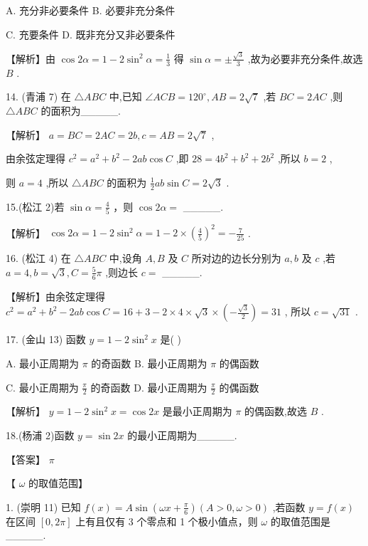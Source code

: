 \documentclass[10pt]{article}
\begin{document}
A. 充分非必要条件 B. 必要非充分条件

C. 充要条件 D. 既非充分又非必要条件

【解析】由 \(\cos {2\alpha } = 1 - 2{\sin }^{2}\alpha  = \frac{1}{3}\) 得 \(\sin \alpha  =  \pm  \frac{\sqrt{3}}{3}\) ,故为必要非充分条件,故选 \(B\) .

14. (青浦 7) 在 \(\bigtriangleup {ABC}\) 中,已知 \(\angle {ACB} = {120}^{ \circ  },{AB} = 2\sqrt{7}\) ,若 \({BC} = {2AC}\) ,则 \(\bigtriangleup {ABC}\) 的面积为\_\_\_\_\_.

【解析】 \(a = {BC} = {2AC} = {2b},c = {AB} = 2\sqrt{7}\) ,

由余弦定理得 \({c}^{2} = {a}^{2} + {b}^{2} - {2ab}\cos C\) ,即 \({28} = 4{b}^{2} + {b}^{2} + 2{b}^{2}\) ,所以 \(b = 2\) ,

则 \(a = 4\) ,所以 \(\bigtriangleup {ABC}\) 的面积为 \(\frac{1}{2}{ab}\sin C = 2\sqrt{3}\) .

15.(松江 2)若 \(\sin \alpha  = \frac{4}{5}\) ，则 \(\cos {2\alpha } =\) \_\_\_\_\_.

【解析】 \(\cos {2\alpha } = 1 - 2{\sin }^{2}\alpha  = 1 - 2 \times  {\left( \frac{4}{5}\right) }^{2} =  - \frac{7}{25}\) .

16. (松江 4) 在 \(\bigtriangleup {ABC}\) 中,设角 \(A,B\) 及 \(C\) 所对边的边长分别为 \(a,b\) 及 \(c\) ,若 \(a = 4,b = \sqrt{3},C = \frac{5}{6}\pi\) ,则边长 \(c =\) \_\_\_\_\_.

【解析】由余弦定理得 \({c}^{2} = {a}^{2} + {b}^{2} - {2ab}\cos C = {16} + 3 - 2 \times  4 \times  \sqrt{3} \times  \left( {-\frac{\sqrt{3}}{2}}\right)  = {31}\) , 所以 \(c = \sqrt{31}\) .

17. (金山 13) 函数 \(y = 1 - 2{\sin }^{2}x\) 是(   )

A. 最小正周期为 \(\pi\) 的奇函数 B. 最小正周期为 \(\pi\) 的偶函数

C. 最小正周期为 \(\frac{\pi }{2}\) 的奇函数 D. 最小正周期为 \(\frac{\pi }{2}\) 的偶函数

【解析】 \(y = 1 - 2{\sin }^{2}x = \cos {2x}\) 是最小正周期为 \(\pi\) 的偶函数,故选 \(B\) .

18.(杨浦 2)函数 \(y = \sin {2x}\) 的最小正周期为\_\_\_\_\_.

【答案】 \(\pi\)

【 \(\omega\) 的取值范围】

1. (崇明 11) 已知 \(f\left( x\right)  = A\sin \left( {{\omega x} + \frac{\pi }{6}}\right) \left( {A > 0,\omega  > 0}\right)\) ,若函数 \(y = f\left( x\right)\) 在区间 \(\left\lbrack  {0,{2\pi }}\right\rbrack\) 上有且仅有 3 个零点和 1 个极小值点，则 \(\omega\) 的取值范围是\_\_\_\_\_.
\end{document}
